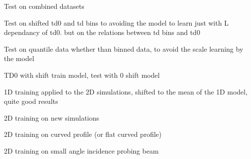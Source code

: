 \documentclass[11pt,a4paper]{report}
\begin{document}
\begin{multicols*}{2}
    Test on combined datasets

    Test on shifted td0 and td bins to avoiding the model to learn just with L dependancy of td0.
    but on the relations between td bins and td0

    Test on quantile data whether than binned data, to avoid the scale learning by the model

    TD0 with shift train model, test with 0 shift model

    1D training applied to the 2D simulations, shifted to the mean of the 1D model, quite good results

    2D training on new simulations

    2D training on curved profile (or flat curved profile)

    2D training on small angle incidence probing beam
\end{multicols*}
\end{document}
